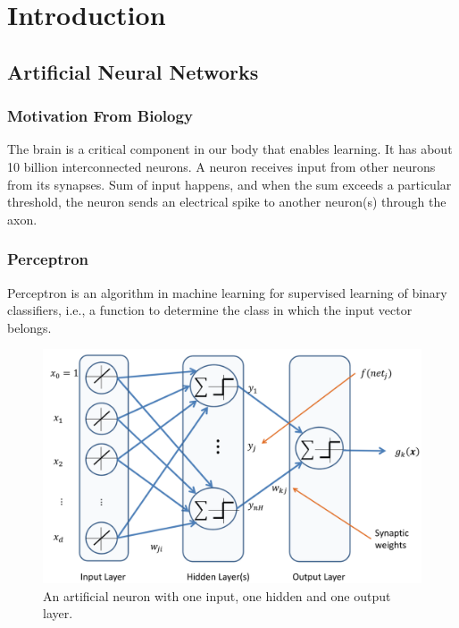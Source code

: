 \section{Introduction}
	\subsection{Artificial Neural Networks}
		\subsubsection{Motivation From Biology}
		The brain is a critical component in our body that enables learning. It has about 10 billion interconnected neurons. A neuron receives input from other neurons from its synapses. Sum of input happens, and when the sum exceeds a particular threshold, the neuron sends an electrical spike to another neuron(s) through the axon. 

		\subsubsection{Perceptron}
		Perceptron is an algorithm in machine learning for supervised learning of binary classifiers, i.e., a function to determine the class in which the input vector belongs.

\begin{figure}
	\centering
		\includegraphics[width=0.6\linewidth]{images/introduction_neural.png}
	\caption{An artificial neuron with one input, one hidden and one output layer.}
	\label{fig:introduction_fig}
	\end{figure}

